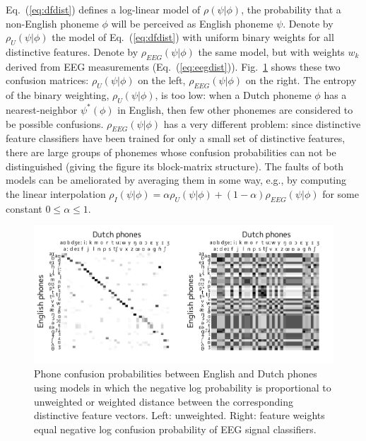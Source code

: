 Eq.~(\ref{eq:dfdist}) defines a log-linear model of $\rho(\psi|\phi)$,
the probability that a non-English phoneme $\phi$ will be perceived as
English phoneme $\psi$.  Denote by $\rho_U(\psi|\phi)$ the model of
Eq.~(\ref{eq:dfdist}) with uniform binary weights for all distinctive
features. Denote by
$\rho_{EEG}(\psi|\phi)$ the same model, but with weights $w_k$ derived
from EEG measurements (Eq.~(\ref{eq:eegdist})).
Fig.~\ref{fig:eeg_confusions} shows these two confusion matrices:
$\rho_U(\psi|\phi)$ on the left, $\rho_{EEG}(\psi|\phi)$ on the
right. The entropy of the binary weighting, $\rho_U(\psi|\phi)$, is
too low: when a Dutch phoneme $\phi$ has a nearest-neighbor
$\psi^*(\phi)$ in English, then few other phonemes are considered to
be possible confusions.  $\rho_{EEG}(\psi|\phi)$ has a very different
problem: since distinctive feature classifiers have been trained for
only a small set of distinctive features, there are large groups of
phonemes whose confusion probabilities can not be distinguished
(giving the figure its block-matrix structure).  The faults of both
models can be ameliorated by averaging them in some way, e.g., by
computing the linear interpolation
$\rho_I(\psi|\phi)=\alpha\rho_U(\psi|\phi)+(1-\alpha)\rho_{EEG}(\psi|\phi)$ for
some constant $0\le\alpha\le 1$.

\begin{figure}
  \centerline{
    \includegraphics[width=\columnwidth]{../figs/confusion-matrix/confusion-matrices.pdf}
  }
    \vspace*{-0.3cm}
  \caption{Phone confusion probabilities between English and Dutch
    phones using models in which the negative log
    probability is proportional to unweighted or weighted
    distance between the corresponding
    distinctive feature vectors.  Left: unweighted.
    Right: feature weights equal negative log confusion
    probability of EEG signal classifiers.}
  \label{fig:eeg_confusions}
\end{figure}

